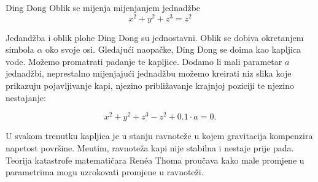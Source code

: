 \begin{surferPage}{Ding Dong}
Oblik se mijenja mijenjanjem jednad\v{z}be\\

\smallskip
\[x^2	+ y^2	+ z^3	= z^2\]

\singlespacing
Jedand\v{z}ba i oblik plohe Ding Dong su jednostavni. Oblik se dobiva okretanjem simbola $\alpha$ oko svoje osi. 
Gledaju\'{c}i naopa\v{c}ke, Ding Dong se doima kao kapljica vode. Mo\v{z}emo promatrati padanje te kapljice.
\newline
Dodamo li mali parametar $a$ jednad\v{z}bi, neprestalno mijenjaju\'{c}i jednad\v{z}bu mo\v{z}emo kreirati niz slika koje prikazuju pojavljivanje kapi, njezino pribli\v{z}avanje krajnjoj poziciji te njezino nestajanje:

\[x^2	+ y^2	+ z^3	-z^2+0.1\cdot a=0.\]

U svakom trenutku kapljica je u stanju ravnote\v{z}e u kojem gravitacija kompenzira napetost povr\v{s}ine. Me\dj{}utim, ravnote\v{z}a kapi nije stabilna i nestaje prije pada. Teorija katastrofe matemati\v{c}ara Ren\'ea Thoma prou\v{c}ava kako male promjene u parametrima mogu uzrokovati promjene u ravnote\v{z}i.
\end{surferPage}
